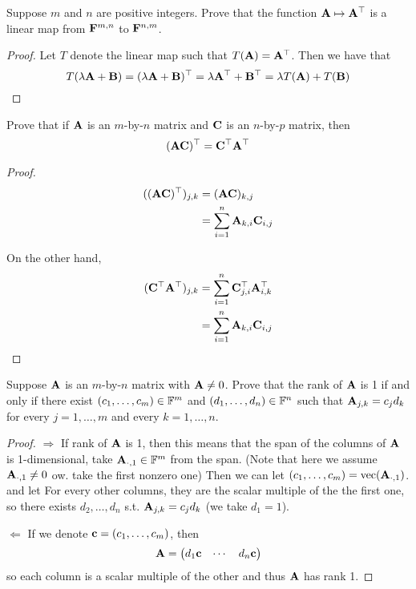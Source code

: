 \documentclass{extarticle}
\begin{document}
\begin{problem}{14}
    Suppose \(m\) and \(n\) are positive integers. Prove that the function \(\mathbf{A} \mapsto \mathbf{A}^\top\)
    is a linear map from \(\mathbf{F}^{m, n}\) to \(\mathbf{F}^{n, m}\).  
\end{problem}

\begin{proof}
Let \(T\) denote the linear map such that \(T(\mathbf{A}) = \mathbf{A}^\top\). Then we have that 
\[T(\lambda \mathbf{A} + \mathbf{B}) = (\lambda \mathbf{A} + \mathbf{B})^\top = \lambda \mathbf{A}^\top + \mathbf{B}^\top = \lambda T(\mathbf{A}) + T(\mathbf{B})\]
\end{proof}

\begin{problem}{15}
    Prove that if \(\mathbf{A}\) is an \(m\)-by-\(n\) matrix and \(\mathbf{C}\) is an \(n\)-by-\(p\) matrix, then 
    \[(\mathbf{A} \mathbf{C})^\top = \mathbf{C}^\top \mathbf{A}^\top\] 
\end{problem}

\begin{proof}
\begin{align*}
    ((\mathbf{A} \mathbf{C})^\top)_{j, k}
    &= (\mathbf{A} \mathbf{C})_{k, j} \\ 
    &= \sum_{i=1}^{n} \mathbf{A}_{k, i} \mathbf{C}_{i, j}
\end{align*}

On the other hand, 
\begin{align*}
    (\mathbf{C}^\top \mathbf{A}^\top)_{j, k}
    &= \sum_{i=1}^{n} \mathbf{C}^\top_{j, i} \mathbf{A}_{i, k}^\top \\ 
    &= \sum_{i=1}^{n} \mathbf{A}_{k, i} \mathbf{C}_{i, j}
\end{align*}
\end{proof}

\begin{problem}{16}
    Suppose \(\mathbf{A}\) is an \(m\)-by-\(n\) matrix with \(\mathbf{A} \neq 0\). Prove that the rank of \(\mathbf{A}\)
    is 1 if and only if there exist \((c_1, \ldots, c_m) \in \mathbb{F}^m\) and 
    \((d_1, \ldots, d_n) \in \mathbb{F}^n\) such that \(\mathbf{A}_{j, k} = c_j d_k\)
    for every \(j = 1, \ldots, m\) and every \(k = 1, \ldots, n\). 
\end{problem}

\begin{proof}
\(\Rightarrow\) If rank of \(\mathbf{A}\) is 1, then this means that the span of 
the columns of \(\mathbf{A}\) is 1-dimensional, take \(\mathbf{A}_{\cdot, 1} \in \mathbb{F}^m\) from the span. 
(Note that here we assume \(\mathbf{A}_{\cdot, 1} \neq 0\) ow. take the first nonzero one)
Then we can let \((c_1, \ldots, c_m) = \text{vec}(\mathbf{A}_{\cdot, 1})\). and let 
For every other columns, they are the scalar multiple of the the first one, so 
there exists \(d_2, \ldots, d_n\) s.t. \(\mathbf{A}_{j, k}  = c_j d_k\) (we take 
\(d_1 = 1\)). 

\(\Leftarrow\) If we denote \( \mathbf{c} = (c_1, \ldots, c_m)\), then 
\[\mathbf{A} =  \begin{pmatrix}
    d_1 \mathbf{c} & \cdots & d_n \mathbf{c}
\end{pmatrix}\]
so each column is a scalar multiple of the other and thus \(\mathbf{A}\) has rank 1. 
\end{proof}
\end{document}
